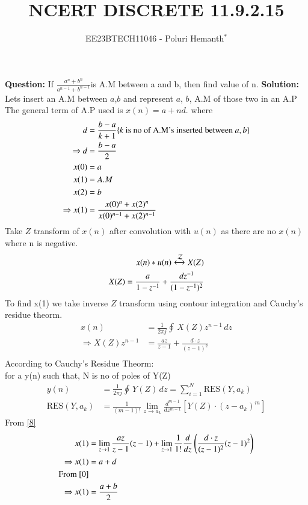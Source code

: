 \documentclass[journal,12pt,twocolumn]{IEEEtran}
\theoremstyle{remark}
\begin{document}

\vspace{3cm}


\title{NCERT DISCRETE 11.9.2.15}
\author{EE23BTECH11046 - Poluri Hemanth$^{*}$}
\maketitle
\textbf{Question:}
If \( \frac{a^n +b^n}{a^{n-1} + b^{n-1}}\)is A.M between a and b, then find value of n.
\break
\textbf{Solution:}
Lets insert an A.M between $a$,$b$ and represent $a$, $b$, A.M of those two in an A.P\\
The general term of A.P used is $x(n)=a+nd$. where
\begin{align}
	\notag d&=\frac{b-a}{k+1}\{k\text{ is no of A.M's inserted between }a ,b\}\\
	\Rightarrow d&=\frac{b-a}{2}\label{0}\\
	x(0)&=a\label{a}\\
	x(1)&=A.M\\
	x(2)&=b\label{b}\\
	\Rightarrow x(1)&=\frac{x(0)^n +x(2)^n}{x(0)^{n-1} + x(2)^{n-1}}\label{r} 
\end{align}
Take $Z$ transform of $x(n)$ after convolution with $u(n)$ as there are no $x(n)$ where n is negative.
\begin{align}
	x(n)*u(n)\large\xleftrightarrow{\mathcal{Z}}X(Z)\\
	X(Z)=\frac{a}{1-z^{-1}}+\frac{dz^{-1}}{(1-z^{-1})^2}
\end{align}
To find x(1) we take inverse $Z$ transform using contour integration and Cauchy's residue theorm.
\begin{align}
	x(n)&=\frac{1}{2\pi j}\oint\,X(Z)z^{n-1}\,dz\\
	\Rightarrow X(Z)z^{n-1}&=\frac{az}{z-1}+\frac{d\cdot z}{(z-1)^2}\label{8}\\
\end{align}
According to Cauchy's Residue Theorm:\\
for a y(n) such that, N is no of poles of Y(Z)\\
\begin{align}
	y(n)&=\frac{1}{2\pi j}\oint\,Y(Z)\,dz=\sum\limits_{i=1}^N\text{RES}(Y,a_k)\\
	\text{RES}(Y,a_k)&=\frac{1}{(m-1)!}\lim_{z\to a_k}\frac{d^{m-1}}{dz^{m-1}}[Y(Z)\cdot(z-a_k)^{m}]
\end{align}
From \eqref{8}
\begin{align}	
	x(1)&=\lim_{z\to1}\frac{az}{z-1}(z-1)+\lim_{z\to1}\frac{1}{1!}\frac{d}{dz}\left(\frac{d\cdot z}{(z-1)^2}(z-1)^2\right)\\
	\Rightarrow x(1)&=a+d\\
	\notag\text{From \eqref{0}}\\
	\Rightarrow x(1)&=\frac{a+b}{2}\label{1}
\end{align}
\end{document}
